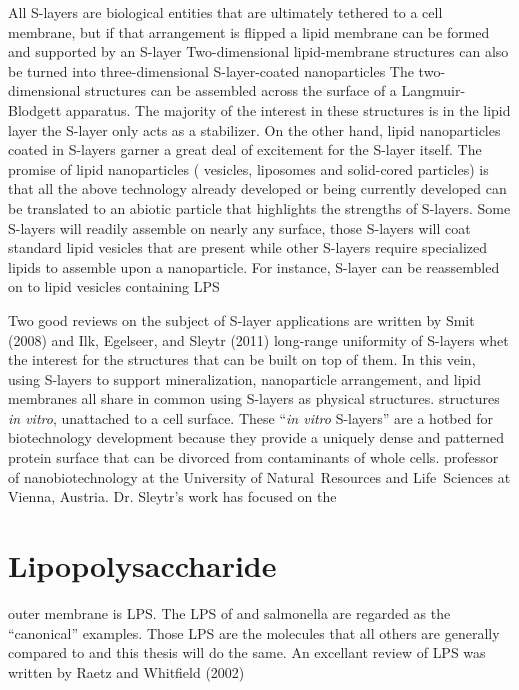   All \acp{S-layer} are biological entities that are ultimately tethered to a cell membrane, but if that arrangement is flipped a lipid membrane can be formed and supported by an
\ac{S-layer} Two-dimensional lipid-membrane structures can also be turned into three-dimensional \ac{S-layer}-coated
nanoparticles The two-dimensional structures can be assembled across the surface of a Langmuir-Blodgett apparatus. The majority of the interest in
these structures is in the lipid layer the \ac{S-layer} only acts as a stabilizer. On the other hand, lipid nanoparticles coated in \acp{S-layer} garner a
great deal of excitement for the \ac{S-layer} itself. The promise of lipid nanoparticles (\ie{} vesicles, liposomes and solid-cored particles) is that all the above technology
already developed or being currently developed can be translated to an abiotic particle that highlights the strengths of \acp{S-layer}. Some \acp{S-layer} will readily assemble on
nearly any surface, those \acp{S-layer} will coat standard lipid vesicles that are present while other \acp{S-layer} require specialized lipids to assemble
upon a nanoparticle. For instance, \caulobacter \ac{S-layer} can be reassembled on to lipid vesicles containing \caulobacter{} \ac{LPS}
  
  Two good reviews on the subject of \ac{S-layer} applications are written by Smit (2008) and Ilk, Egelseer, and Sleytr (2011) %
long-range uniformity of \acp{S-layer} whet the interest for the structures that can be built on top of them. In this vein, using \acp{S-layer} to support mineralization,
nanoparticle arrangement, and lipid membranes all share in common using \acp{S-layer} as physical structures. %
structures \textit{in vitro}, unattached to a cell surface. These ``\textit{in vitro} \acp{S-layer}'' are a hotbed for biotechnology development because they provide a uniquely
dense and patterned protein surface that can be divorced from contaminants of whole cells. %
professor of nanobiotechnology at the University of Natural~Resources and Life~Sciences at Vienna, Austria. Dr. Sleytr's work has focused on the

\section{Lipopolysaccharide}\label{sec:intro-lps} %
outer membrane is \ac{LPS}. The \ac{LPS} of \ecoli and \ac{salmonella} are regarded as the ``canonical'' examples. Those \ac{LPS} are the molecules that all others are generally
compared to and this thesis will do the same. An excellant review of \ac{LPS} was written by Raetz and Whitfield (2002)

